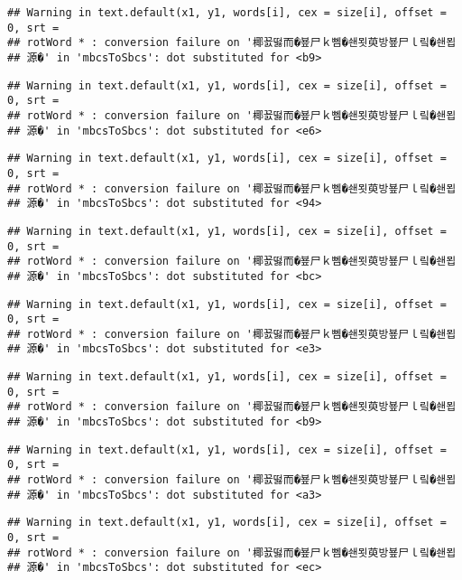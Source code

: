 \documentclass[]{article}
\begin{document}
\begin{verbatim}
## Warning in text.default(x1, y1, words[i], cex = size[i], offset = 0, srt =
## rotWord * : conversion failure on '椰꾨떯而�뵾尸ｋ뻼�쇈묏萸방뵾尸ｌ맄�쇈묍
## 源�' in 'mbcsToSbcs': dot substituted for <b9>
\end{verbatim}

\begin{verbatim}
## Warning in text.default(x1, y1, words[i], cex = size[i], offset = 0, srt =
## rotWord * : conversion failure on '椰꾨떯而�뵾尸ｋ뻼�쇈묏萸방뵾尸ｌ맄�쇈묍
## 源�' in 'mbcsToSbcs': dot substituted for <e6>
\end{verbatim}

\begin{verbatim}
## Warning in text.default(x1, y1, words[i], cex = size[i], offset = 0, srt =
## rotWord * : conversion failure on '椰꾨떯而�뵾尸ｋ뻼�쇈묏萸방뵾尸ｌ맄�쇈묍
## 源�' in 'mbcsToSbcs': dot substituted for <94>
\end{verbatim}

\begin{verbatim}
## Warning in text.default(x1, y1, words[i], cex = size[i], offset = 0, srt =
## rotWord * : conversion failure on '椰꾨떯而�뵾尸ｋ뻼�쇈묏萸방뵾尸ｌ맄�쇈묍
## 源�' in 'mbcsToSbcs': dot substituted for <bc>
\end{verbatim}

\begin{verbatim}
## Warning in text.default(x1, y1, words[i], cex = size[i], offset = 0, srt =
## rotWord * : conversion failure on '椰꾨떯而�뵾尸ｋ뻼�쇈묏萸방뵾尸ｌ맄�쇈묍
## 源�' in 'mbcsToSbcs': dot substituted for <e3>
\end{verbatim}

\begin{verbatim}
## Warning in text.default(x1, y1, words[i], cex = size[i], offset = 0, srt =
## rotWord * : conversion failure on '椰꾨떯而�뵾尸ｋ뻼�쇈묏萸방뵾尸ｌ맄�쇈묍
## 源�' in 'mbcsToSbcs': dot substituted for <b9>
\end{verbatim}

\begin{verbatim}
## Warning in text.default(x1, y1, words[i], cex = size[i], offset = 0, srt =
## rotWord * : conversion failure on '椰꾨떯而�뵾尸ｋ뻼�쇈묏萸방뵾尸ｌ맄�쇈묍
## 源�' in 'mbcsToSbcs': dot substituted for <a3>
\end{verbatim}

\begin{verbatim}
## Warning in text.default(x1, y1, words[i], cex = size[i], offset = 0, srt =
## rotWord * : conversion failure on '椰꾨떯而�뵾尸ｋ뻼�쇈묏萸방뵾尸ｌ맄�쇈묍
## 源�' in 'mbcsToSbcs': dot substituted for <ec>
\end{verbatim}
\end{document}
